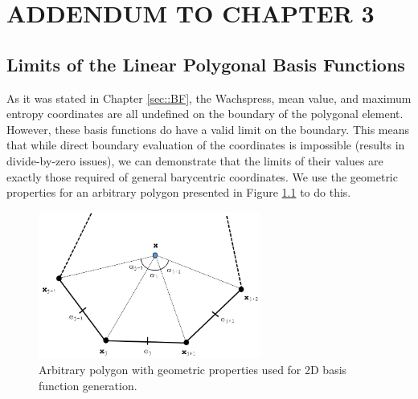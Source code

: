 %
%
%

\chapter{\uppercase{Addendum to Chapter 3}}
\label{sec::appendix_BF}

\section{Limits of the Linear Polygonal Basis Functions}
\label{sec::appendix_BF_Limits}

As it was stated in Chapter \ref{sec::BF}, the Wachspress, mean value, and maximum entropy coordinates are all undefined on the boundary of the polygonal element. However, these basis functions do have a valid limit on the boundary. This means that while direct boundary evaluation of the coordinates is impossible (results in divide-by-zero issues), we can demonstrate that the limits of their values are exactly those required of general barycentric coordinates. We use the geometric properties for an arbitrary polygon presented in Figure \ref{fig::App_BF_2D_ref_polygon} to do this.

\begin{figure}
\centering
\includegraphics[width=0.65\textwidth]{figures/appendices/ref_polygon.png}
\caption{Arbitrary polygon with geometric properties used for 2D basis function generation.}
\label{fig::App_BF_2D_ref_polygon}
\end{figure}

